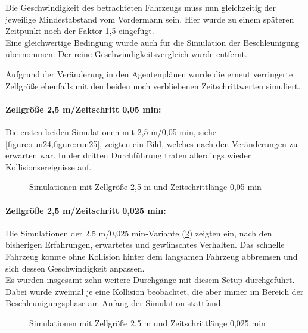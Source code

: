 Die Geschwindigkeit des betrachteten Fahrzeugs muss nun gleichzeitig der jeweilige Mindestabstand vom Vordermann sein. 
Hier wurde zu einem späteren Zeitpunkt noch der Faktor 1,5 eingefügt.
\\
Eine gleichwertige Bedingung wurde auch für die Simulation der Beschleunigung übernommen.
Der reine Geschwindigkeitsvergleich wurde entfernt.

Aufgrund der Veränderung in den Agentenplänen wurde die erneut verringerte Zellgröße ebenfalls mit den beiden noch verbliebenen Zeitschrittwerten simuliert.


\paragraph*{Zellgröße 2,5 m/Zeitschritt 0,05 min:}
Die ersten beiden Simulationen mit 2,5 m/0,05 min, siehe \cref{figure:run24,figure:run25}, zeigten ein Bild, welches nach den Veränderungen zu erwarten war.
In der dritten Durchführung traten allerdings wieder Kollisionsereignisse auf.
\begin{figure}[hptb]
  \centering 
   \qquad 
   \qquad 
  \caption{Simulationen mit Zellgröße 2,5 m und Zeitschrittlänge 0,05 min} 
  \label{figure:run24-26}
\end{figure}


\paragraph*{Zellgröße 2,5 m/Zeitschritt 0,025 min:}
Die Simulationen der 2,5 m/0,025 min-Variante (\cref{figure:run27-29}) zeigten ein, nach den bisherigen Erfahrungen, erwartetes und gewünschtes Verhalten.
Das schnelle Fahrzeug konnte ohne Kollision hinter dem langsamen Fahrzeug abbremsen und sich dessen Geschwindigkeit anpassen.
\\
Es wurden insgesamt zehn weitere Durchgänge mit diesem Setup durchgeführt. 
Dabei wurde zweimal je eine Kollision beobachtet, die aber immer im Bereich der Beschleunigungsphase am Anfang der Simulation stattfand. 
\begin{figure}[hptb]
  \centering 
   \qquad 
   \qquad 
  \caption{Simulationen mit Zellgröße 2,5 m und Zeitschrittlänge 0,025 min} 
  \label{figure:run27-29}
\end{figure}



